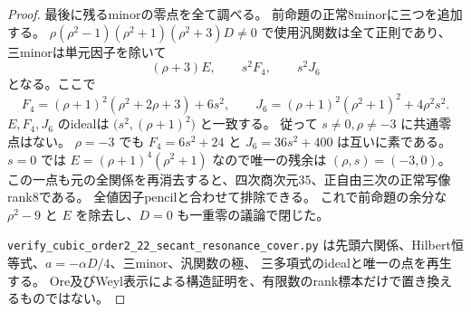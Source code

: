 \begin{proof}
最後に残るminorの零点を全て調べる。
前命題の正常8minorに三つを追加する。
$\rho(\rho^2-1)(\rho^2+1)(\rho^2+3)D\ne0$ で使用汎関数は全て正則であり、
三minorは単元因子を除いて
\[
 (\rho+3)E,\qquad s^2F_4,\qquad s^2J_6
\]
となる。ここで
\[
 F_4=(\rho+1)^2(\rho^2+2\rho+3)+6s^2,\qquad
 J_6=(\rho+1)^2(\rho^2+1)^2+4\rho^2s^2.
\]
$E,F_4,J_6$ のidealは $\bigl(s^2,(\rho+1)^2\bigr)$ と一致する。
従って $s\ne0,\rho\ne-3$ に共通零点はない。
$\rho=-3$ でも $F_4=6s^2+24$ と $J_6=36s^2+400$ は互いに素である。
$s=0$ では $E=(\rho+1)^4(\rho^2+1)$ なので唯一の残余は $(\rho,s)=(-3,0)$。
この一点も元の全関係を再消去すると、四次商次元35、正自由三次の正常写像rank8である。
全値因子pencilと合わせて排除できる。
これで前命題の余分な $\rho^2-9$ と $E$ を除去し、$D=0$ も一重零の議論で閉じた。

\texttt{verify\_cubic\_order2\_22\_secant\_resonance\_cover.py}
は先頭六関係、Hilbert恒等式、$a=-\alpha D/4$、三minor、汎関数の極、
三多項式のidealと唯一の点を再生する。
Ore及びWeyl表示による構造証明を、有限数のrank標本だけで置き換えるものではない。
\end{proof}
